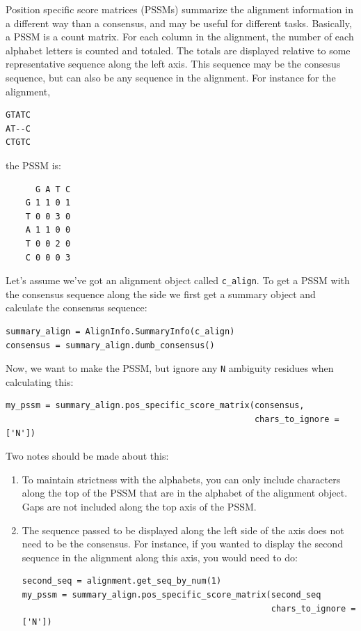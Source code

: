 \documentclass{report}
\begin{document}
Position specific score matrices (PSSMs) summarize the alignment information in a different way than a consensus, and may be useful for different tasks. Basically, a PSSM is a count matrix. For each column in the alignment, the number of each alphabet letters is counted and totaled. The totals are displayed relative to some representative sequence along the left axis. This sequence may be the consesus sequence, but can also be any sequence in the alignment. For instance for the alignment,

\begin{verbatim}
GTATC
AT--C
CTGTC
\end{verbatim}

\noindent the PSSM is:

\begin{verbatim}
      G A T C
    G 1 1 0 1
    T 0 0 3 0
    A 1 1 0 0
    T 0 0 2 0
    C 0 0 0 3
\end{verbatim}

Let's assume we've got an alignment object called \verb|c_align|. To get a PSSM with the consensus sequence along the side we first get a summary object and calculate the consensus sequence:

\begin{verbatim}
summary_align = AlignInfo.SummaryInfo(c_align)
consensus = summary_align.dumb_consensus()
\end{verbatim}

Now, we want to make the PSSM, but ignore any \verb|N| ambiguity residues when calculating this:

\begin{verbatim}
my_pssm = summary_align.pos_specific_score_matrix(consensus,
                                                  chars_to_ignore = ['N'])
\end{verbatim}

Two notes should be made about this:

\begin{enumerate}
  \item To maintain strictness with the alphabets, you can only include characters along the top of the PSSM that are in the alphabet of the alignment object. Gaps are not included along the top axis of the PSSM.

  \item The sequence passed to be displayed along the left side of the axis does not need to be the consensus. For instance, if you wanted to display the second sequence in  the alignment along this axis, you would need to do:

\begin{verbatim}
second_seq = alignment.get_seq_by_num(1)
my_pssm = summary_align.pos_specific_score_matrix(second_seq
                                                  chars_to_ignore = ['N'])
\end{verbatim}

\end{enumerate}
\end{document}
